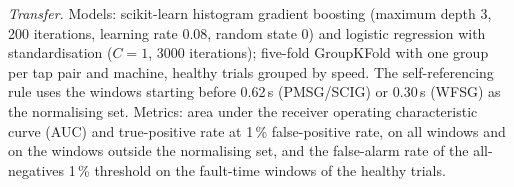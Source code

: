 \begin{appendices}
\emph{Transfer.} Models: scikit-learn histogram gradient boosting (maximum depth 3, 200 iterations, learning rate 0.08, random state 0) and logistic regression with standardisation ($C=1$, 3000 iterations); five-fold GroupKFold with one group per tap pair and machine, healthy trials grouped by speed. The self-referencing rule uses the windows starting before 0.62\,s (PMSG/SCIG) or 0.30\,s (WFSG) as the normalising set. Metrics: area under the receiver operating characteristic curve (AUC) and true-positive rate at 1\,\% false-positive rate, on all windows and on the windows outside the normalising set, and the false-alarm rate of the all-negatives 1\,\% threshold on the fault-time windows of the healthy trials.

\end{appendices}
